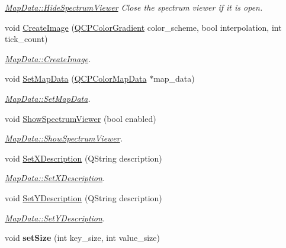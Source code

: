 \begin{DoxyCompactItemize}
\begin{DoxyCompactList}\small\item\em \hyperlink{class_map_data_a61f4104e14f8b8e0d1a51872412737e1}{Map\+Data\+::\+Hide\+Spectrum\+Viewer} Close the spectrum viewer if it is open. \end{DoxyCompactList}\item 
void \hyperlink{class_map_data_ad1fe1aaad46b33c4f6a2be1d7f889dee}{Create\+Image} (\hyperlink{class_q_c_p_color_gradient}{Q\+C\+P\+Color\+Gradient} color\+\_\+scheme, bool interpolation, int tick\+\_\+count)
\begin{DoxyCompactList}\small\item\em \hyperlink{class_map_data_ad1fe1aaad46b33c4f6a2be1d7f889dee}{Map\+Data\+::\+Create\+Image}. \end{DoxyCompactList}\item 
void \hyperlink{class_map_data_a69f3cc1424820012dd81b21a171b1811}{Set\+Map\+Data} (\hyperlink{class_q_c_p_color_map_data}{Q\+C\+P\+Color\+Map\+Data} $\ast$map\+\_\+data)
\begin{DoxyCompactList}\small\item\em \hyperlink{class_map_data_a69f3cc1424820012dd81b21a171b1811}{Map\+Data\+::\+Set\+Map\+Data}. \end{DoxyCompactList}\item 
void \hyperlink{class_map_data_af89b6dafdaa3a857c8c99256efabaa01}{Show\+Spectrum\+Viewer} (bool enabled)
\begin{DoxyCompactList}\small\item\em \hyperlink{class_map_data_af89b6dafdaa3a857c8c99256efabaa01}{Map\+Data\+::\+Show\+Spectrum\+Viewer}. \end{DoxyCompactList}\item 
void \hyperlink{class_map_data_a83f631070387a73af804b39cd8463c83}{Set\+X\+Description} (Q\+String description)
\begin{DoxyCompactList}\small\item\em \hyperlink{class_map_data_a83f631070387a73af804b39cd8463c83}{Map\+Data\+::\+Set\+X\+Description}. \end{DoxyCompactList}\item 
void \hyperlink{class_map_data_a7c08027239b5dada495ab7087b13a983}{Set\+Y\+Description} (Q\+String description)
\begin{DoxyCompactList}\small\item\em \hyperlink{class_map_data_a7c08027239b5dada495ab7087b13a983}{Map\+Data\+::\+Set\+Y\+Description}. \end{DoxyCompactList}\item 
void {\bfseries set\+Size} (int key\+\_\+size, int value\+\_\+size)\hypertarget{class_map_data_aae8067a6dcb4d2a43121903cf2937e6e}{}\label{class_map_data_aae8067a6dcb4d2a43121903cf2937e6e}


\end{DoxyCompactItemize}
